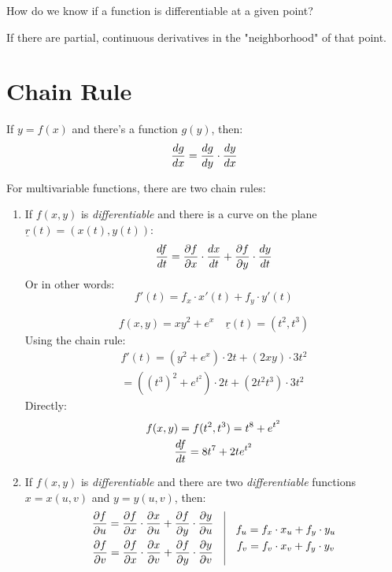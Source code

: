 \documentclass[00_complete]{subfiles}
\begin{document}
How do we know if a function is differentiable at a given point?

If there are partial, continuous derivatives in the "neighborhood" of that
point.
\section{Chain Rule}
\begin{reminder}
    If $y=f(x)$ and there's a function $g(y)$, then:
    $$\dv{g}{x} = \dv{g}{y} \cdot \dv{y}{x}$$
\end{reminder}
For multivariable functions, there are two chain rules:
\begin{enumerate}
    \item If $f(x,y)$ is \emph{differentiable} and there is a curve on the plane
        $\underline r(t)=(x(t),y(t))$:
        $$\dv{f}{t}=\pdv{f}{x}\cdot \dv{x}{t} + \pdv{f}{y}\cdot \dv{y}{t}$$
        Or in other words:
        $$f'(t)=f_x\cdot x'(t)+f_y\cdot y'(t)$$
        \begin{example}
            $$f(x,y)=xy^2+e^x \quad \underline r(t)=(t^2,t^3)$$
            Using the chain rule:
            \begin{gather*}
            f'(t)=(y^2+e^x)\cdot 2t + (2xy) \cdot 3t^2 \\
            =((t^3)^2+e^{t^2})\cdot 2t + (2t^2t^3)\cdot 3t^2
            \end{gather*}
            Directly:
            \begin{gather*}
                f(x,y)=f(t^2,t^3) = t^8+e^{t^2} \\
                \dv{f}{t}=8t^7+2te^{t^2}
            \end{gather*}
        \end{example}
    \item If $f(x,y)$ is \emph{differentiable} and there are two
        \emph{differentiable} functions $x=x(u,v)$ and $y=y(u,v)$, then:
        \begin{gather*}
            \begin{gathered}
            \pdv{f}{u} = \pdv{f}{x}\cdot \pdv{x}{u}+ \pdv{f}{y}\cdot \pdv{y}{u}\\
            \pdv{f}{v} = \pdv{f}{x}\cdot \pdv{x}{v}+ \pdv{f}{y}\cdot \pdv{y}{v}
            \end{gathered} \quad \vline \quad \begin{gathered}
                f_u=f_x\cdot x_u + f_y\cdot y_u\\
                f_v=f_v\cdot x_v + f_y\cdot y_v\\
            \end{gathered}
        \end{gather*}
\end{enumerate}
\end{document}
